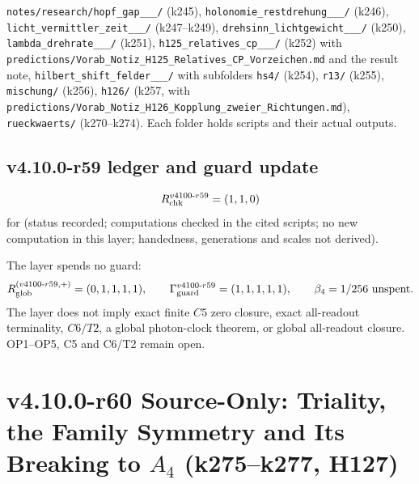 {\raggedright
\texttt{notes/\allowbreak research/\allowbreak hopf\_\allowbreak gap\_\_\_/} (k245),
\texttt{holonomie\_\allowbreak restdrehung\_\_\_/} (k246),
\texttt{licht\_\allowbreak vermittler\_\allowbreak zeit\_\_\_/} (k247--k249),
\texttt{drehsinn\_\allowbreak lichtgewicht\_\_\_/} (k250),
\texttt{lambda\_\allowbreak drehrate\_\_\_/} (k251),
\texttt{h125\_\allowbreak relatives\_\allowbreak cp\_\_\_/} (k252) with
\texttt{predictions/\allowbreak Vorab\_\allowbreak Notiz\_\allowbreak H125\_\allowbreak Relatives\_\allowbreak CP\_\allowbreak Vorzeichen.md} and the result note,
\texttt{hilbert\_\allowbreak shift\_\allowbreak felder\_\_\_/} with subfolders \texttt{hs4/} (k254), \texttt{r13/} (k255),
\texttt{mischung/} (k256), \texttt{h126/} (k257, with \texttt{predictions/\allowbreak Vorab\_\allowbreak Notiz\_\allowbreak H126\_\allowbreak Kopplung\_\allowbreak zweier\_\allowbreak Richtungen.md}),
\texttt{rueckwaerts/} (k270--k274).  Each folder holds scripts and their actual outputs.
\par}

\subsection*{v4.10.0-r59 ledger and guard update}
\label{subsec:v4100-r59-ledger-guard}

\[
R_{\rm chk}^{v4100\text{-}r59}=(1,1,0)
\]
for (status recorded; computations checked in the cited scripts; no new computation in this layer; handedness, generations and scales not derived).

The layer spends no guard:
\[
R_{\rm glob}^{(v4100\text{-}r59,+)}=(0,1,1,1,1),
\qquad
\Gamma_{\rm guard}^{v4100\text{-}r59}=(1,1,1,1,1),
\qquad
\beta_4=1/256\ \text{unspent}.
\]
The layer does not imply exact finite \(C5\) zero closure, exact all-readout terminality, \(C6/T2\), a global photon-clock theorem,
or global all-readout closure.  OP1--OP5, C5 and C6/T2 remain open.

\clearpage
\section*{v4.10.0-r60 Source-Only: Triality, the Family Symmetry and Its Breaking to \texorpdfstring{\(A_4\)}{A4} (k275--k277, H127)}
\label{sec:v4100-r60-triality-a4}


